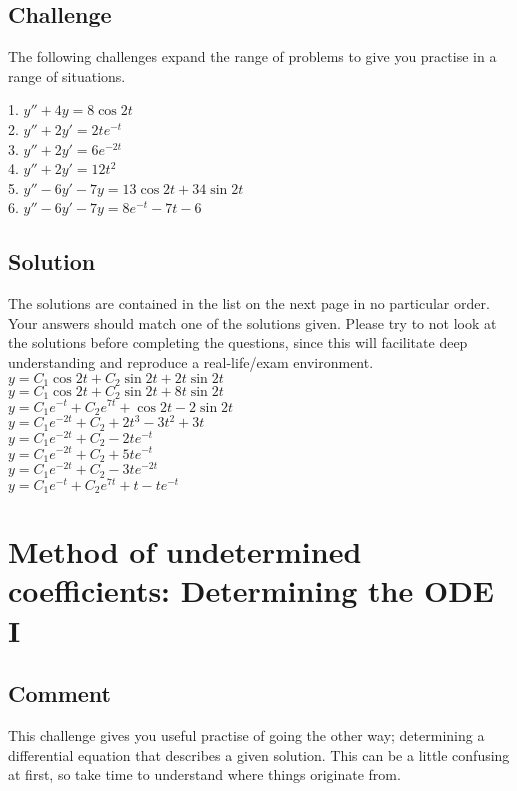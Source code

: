 

\subsection*{Challenge}
The following challenges expand the range of problems to give you practise in a range of situations.

1. $y'' + 4y = 8 \cos 2t$\\
2. $y'' + 2y' = 2 te^{-t}$\\
3. $y'' + 2y' = 6 e^{-2t}$\\
4. $y'' + 2y' = 12 t^2$\\
5. $y'' - 6y' - 7y = 13 \cos 2t + 34 \sin 2t$\\
6. $y'' - 6y' - 7y = 8e^{-t} - 7t - 6$

\subsection*{Solution}
The solutions are contained in the list on the next page in no particular order. Your answers should match one of the solutions given. Please try to not look at the solutions before completing the questions, since this will facilitate deep understanding and reproduce a real-life/exam environment.
\newpage
$y = C_1 \cos 2t + C_2 \sin 2t + 2t \sin2t$\\ %
$y = C_1 \cos 2t + C_2 \sin 2t + 8t \sin2t$\\
$y = C_1 e^{-t} + C_2 e^{7t} + \cos 2t - 2 \sin 2t$\\ %
$y = C_1 e^{-2t} + C_2 + 2t^3 - 3t^2 + 3t$\\ %
$y = C_1 e^{-2t} + C_2 - 2te^{-t}$\\ %
$y = C_1 e^{-2t} + C_2 + 5te^{-t}$\\
$y = C_1 e^{-2t} + C_2 - 3te^{-2t}$\\ %
$y = C_1 e^{-t} +C_2 e^{7t} + t -te^{-t}$\\ %




\newpage
\section{Method of undetermined coefficients: Determining the ODE I}

\subsection*{Comment}
This challenge gives you useful practise of going the other way; determining a differential equation that describes a given solution. This can be a little confusing at first, so take time to understand where things originate from.

